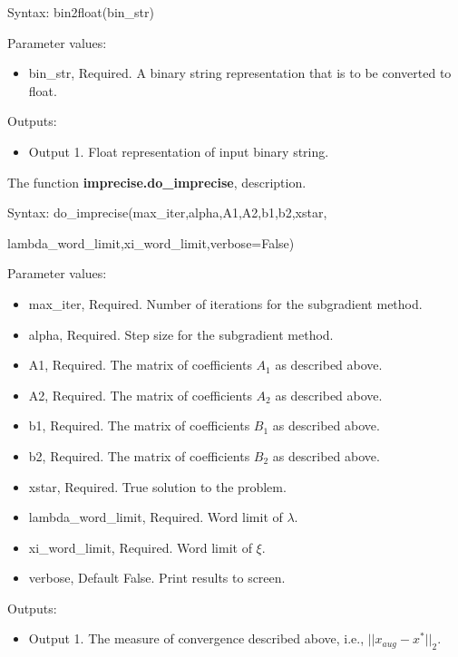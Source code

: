 \documentclass[12pt]{article}
\begin{document}
Syntax: bin2float(bin\_str)

Parameter values:
\begin{itemize}
	\item bin\_str, Required. A binary string representation that is to be converted to float.
\end{itemize}

Outputs:
\begin{itemize}
	\item Output 1. Float representation of input binary string. 
\end{itemize}

\noindent The function \textbf{imprecise.do\_imprecise}, description.

Syntax: do\_imprecise(max\_iter,alpha,A1,A2,b1,b2,xstar,

\qquad\qquad\qquad\qquad lambda\_word\_limit,xi\_word\_limit,verbose=False)

Parameter values:
\begin{itemize}
	\item max\_iter, Required. Number of iterations for the subgradient method.
	\item alpha, Required. Step size for the subgradient method.
	\item A1, Required. The matrix of coefficients $A_1$ as described above.
	\item A2, Required. The matrix of coefficients $A_2$ as described above.
	\item b1, Required. The matrix of coefficients $B_1$ as described above.
	\item b2, Required. The matrix of coefficients $B_2$ as described above.
	\item xstar, Required. True solution to the problem.
	\item lambda\_word\_limit, Required. Word limit of $\lambda$.
	\item xi\_word\_limit, Required. Word limit of $\xi$.
	\item verbose, Default False. Print results to screen.
\end{itemize}

Outputs:
\begin{itemize}
	\item Output 1. The measure of convergence described above, i.e., $||x_{aug}-x^*||_2$.
\end{itemize}
\end{document}
